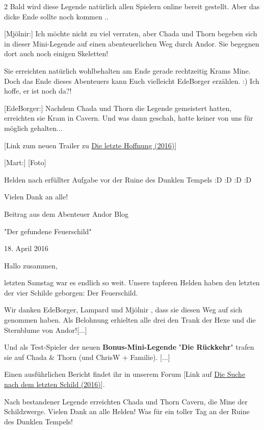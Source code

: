 \documentclass[10pt, a4paper, oneside]{book}
\begin{document}
\begin{multicols}{2}
Bald wird diese Legende natürlich allen Spielern online bereit gestellt. Aber das dicke Ende sollte noch kommen ..

[Mjölnir:] Ich möchte nicht zu viel verraten, aber Chada und Thorn begeben sich in dieser Mini-Legende auf einen abenteuerlichen Weg durch Andor. Sie begegnen dort auch noch einigen Skeletten!

Sie erreichten natürlich wohlbehalten am Ende gerade rechtzeitig Krams Mine. Doch das Ende dieses Abenteuers kann Euch vielleicht EdeBorger erzählen. :) Ich hoffe, er ist noch da?!

[EdeBorger:] Nachdem Chada und Thorn die Legende gemeistert hatten, erreichten sie Kram in Cavern. Und was dann geschah, hatte keiner von uns für möglich gehalten...

[Link zum neuen Trailer zu \hyperref[produkt-2016-die-letzte-hoffnung]{Die letzte Hoffnung (2016)}]

[Mart:] [Foto]

Helden nach erfüllter Aufgabe vor der Ruine des Dunklen Tempels :D :D :D :D

Vielen Dank an alle!


\begin{center}
    Beitrag aus dem Abenteuer Andor Blog

    "Der gefundene Feuerschild"

    18. April 2016
\end{center}




Hallo zusammen,

letzten Samstag war es endlich so weit. Unsere tapferen Helden haben den letzten der vier Schilde geborgen: Der Feuerschild.

Wir danken EdeBorger, Lampard und Mjölnir , dass sie diesen Weg auf sich genommen haben. Als Belohnung erhielten alle drei den Trank der Hexe und die Sternblume von Andor![...]

Und als Test-Spieler der neuen \textbf{Bonus-Mini-Legende} "\textbf{Die Rückkehr}" trafen sie auf Chada \& Thorn (und ChrisW + Familie). [...]

Einen ausführlichen Bericht findet ihr in unserem Forum [Link auf \hyperref[storytext-2016-die-suche-nach-dem-letzten-schild]{Die Suche nach dem letzten Schild (2016)}].

Nach bestandener Legende erreichten Chada und Thorn Cavern, die Mine der Schildzwerge.
Vielen Dank an alle Helden! Was für ein toller Tag an der Ruine des Dunklen Tempels!


\end{multicols}
\end{document}
